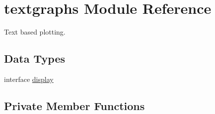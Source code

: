 \hypertarget{classtextgraphs}{\section{textgraphs Module Reference}
\label{classtextgraphs}
}


Text based plotting.  


\subsection*{Data Types}
\begin{DoxyCompactItemize}
\item 
interface \hyperlink{interfacetextgraphs_1_1display}{display}
\end{DoxyCompactItemize}
\subsection*{Private Member Functions}

